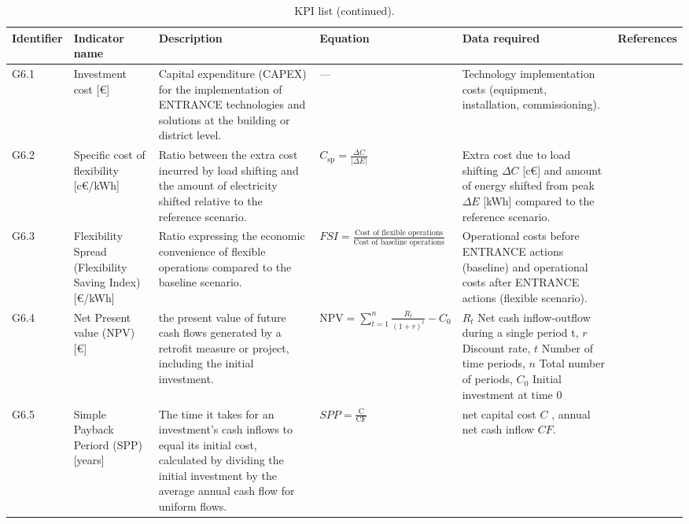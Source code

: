 \begin{table}
    \ContinuedFloat
    \centering
    \caption[]{KPI list (continued).}

    \fontsize{9.5pt}{11pt}\selectfont
    \setlength{\tabcolsep}{2pt}
    \renewcommand{\arraystretch}{0.95}

    \begin{tabularx}{\textheight}{%
        >{\centering\arraybackslash}m{1.0cm}
        >{\centering\arraybackslash}p{2.2cm}
        >{\centering\arraybackslash}X
        >{\centering\arraybackslash}X
        >{\centering\arraybackslash}X
        >{\centering\arraybackslash}X}
        \hline
        \textbf{Identifier} & \textbf{Indicator name} & \textbf{Description} & \textbf{Equation} & \textbf{Data required} & \textbf{References}\\
        \hline
        G6.1 & Investment cost {[}\euro{]} &
        Capital expenditure (CAPEX) for the implementation of ENTRANCE technologies and solutions at the building or district level. &
        --- &
        Technology implementation costs (equipment, installation, commissioning). \\
        \hline
        G6.2 & Specific cost of flexibility {[}c\euro/kWh{]} &
        Ratio between the extra cost incurred by load shifting and the amount of electricity shifted relative to the reference scenario. &
        \(\displaystyle C_{\mathrm{sp}} = \frac{\Delta C}{|\Delta E|}\) &
        Extra cost due to load shifting $\Delta C$ [c\euro] and amount of energy shifted from peak $\Delta E$ [kWh] compared to the reference scenario. \\
        \hline
        G6.3 & Flexibility Spread (Flexibility Saving Index) {[}\euro/kWh{]} &
        Ratio expressing the economic convenience of flexible operations compared to the baseline scenario. &
        \(\displaystyle FSI = \frac{\text{Cost of flexible operations}}{\text{Cost of baseline operations}}\) &
        Operational costs before ENTRANCE actions (baseline) and operational costs after ENTRANCE actions (flexible scenario). \\
        \hline
        G6.4 & Net Present value (NPV) {[}\euro{]} &
        the present value of future cash flows generated by a retrofit measure or project, including the initial investment. &
        \(\displaystyle \text{NPV} = \sum_{t=1}^{n} \frac{R_t}{(1 + r)^t} - C_0\) &
        $R_t$ Net cash inflow-outflow during a single period t, $r$ Discount rate, $t$ Number of time periods, $n$ Total number of periods, $C_0$ Initial investment at time 0 \\
        \hline
        G6.5 & Simple Payback Periord (SPP) {[}years{]} &
        The time it takes for an investment's cash inflows to equal its initial cost, calculated by dividing the initial investment by the average annual cash flow for uniform flows. &
        \(\displaystyle SPP = \frac{\text{C}}{\text{CF}}\) &
        net capital cost $C$ , annual net cash inflow $CF$. \\
        \hline
    \end{tabularx}
\end{table}